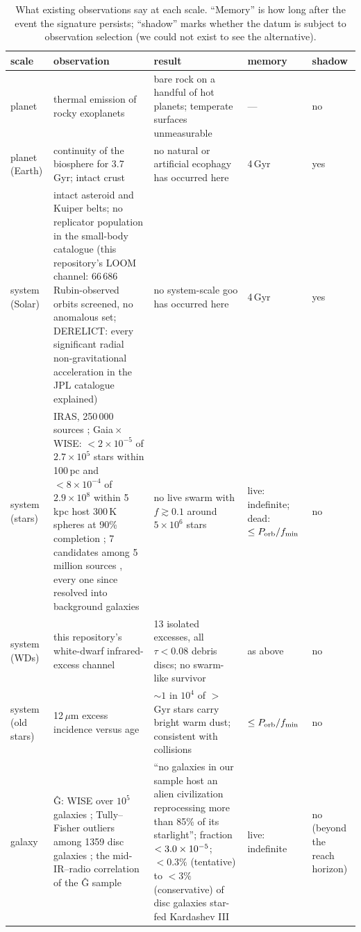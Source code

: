 \documentclass[11pt]{article}
\newcommand{\um}{\ensuremath{\,\mu\mathrm{m}}\xspace}
\newcommand{\Ghat}{\^{G}\xspace}
\begin{document}
\begin{table}
\centering
\small
\caption{What existing observations say at each scale.  ``Memory'' is how
long after the event the signature persists; ``shadow'' marks whether the
datum is subject to observation selection (we could not exist to see the
alternative).}
\label{tab:record}
\begin{tabular}{p{2.6cm}p{4.2cm}p{4.3cm}p{1.6cm}p{1.3cm}}
\toprule
scale & observation & result & memory & shadow \\
\midrule
planet & thermal emission of rocky exoplanets \citep{Kreidberg2019,Greene2023,Zieba2023} & bare rock on a handful of hot planets; temperate surfaces unmeasurable & --- & no \\
planet (Earth) & continuity of the biosphere for 3.7\,Gyr; intact crust & no natural or artificial ecophagy has occurred here & 4\,Gyr & yes \\
system (Solar) & intact asteroid and Kuiper belts; no replicator population in the small-body catalogue (this repository's LOOM channel: 66\,686 Rubin-observed orbits screened, no anomalous set; DERELICT: every significant radial non-gravitational acceleration in the JPL catalogue explained) & no system-scale goo has occurred here & 4\,Gyr & yes \\
system (stars) & IRAS, 250\,000 sources \citep{Carrigan2009}; Gaia\,$\times$\,WISE: $<2\times10^{-5}$ of $2.7\times10^{5}$ stars within 100\,pc and $<8\times10^{-4}$ of $2.9\times10^{8}$ within 5\,kpc host 300\,K spheres at 90\% completion \citep{Suazo2022}; 7 candidates among 5 million sources \citep{Suazo2024}, every one since resolved into background galaxies \citep{Ren2024,Zackrisson2026} & no live swarm with $f\gtrsim0.1$ around $5\times10^{6}$ stars & live: indefinite; dead: $\leq P_{\rm orb}/f_{\min}$ & no \\
system (WDs) & this repository's white-dwarf infrared-excess channel & 13 isolated excesses, all $\tau<0.08$ debris discs; no swarm-like survivor & as above & no \\
system (old stars) & 12\um excess incidence versus age \citep{KennedyWyatt2013} & $\sim1$ in $10^{4}$ of $>$Gyr stars carry bright warm dust; consistent with collisions & $\leq P_{\rm orb}/f_{\min}$ & no \\
galaxy & \Ghat: WISE over $10^{5}$ galaxies \citep{Wright2014b,Griffith2015}; Tully--Fisher outliers among 1359 disc galaxies \citep{Zackrisson2015}; the mid-IR--radio correlation of the \Ghat sample \citep{Garrett2015} & ``no galaxies in our sample host an alien civilization reprocessing more than 85\% of its starlight''; fraction $<3.0\times10^{-5}$; $<0.3\%$ (tentative) to $<3\%$ (conservative) of disc galaxies star-fed Kardashev III & live: indefinite & no (beyond the reach horizon) \\
\bottomrule
\end{tabular}
\end{table}
\end{document}
